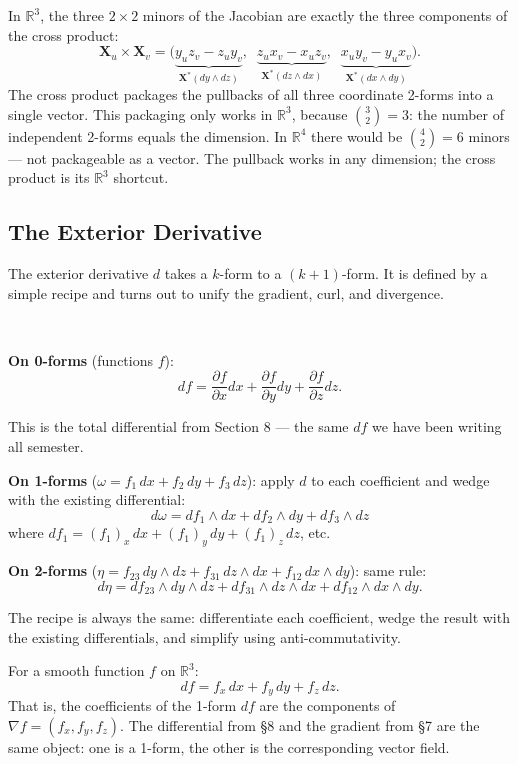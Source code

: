 \documentclass[11pt]{report}
\newcommand{\R}{\mathbb{R}}
\newcommand{\parti}[2]{\frac{\partial #1}{\partial #2}}
\begin{document}
\begin{remark}
In $\R^3$, the three $2 \times 2$ minors of the Jacobian are exactly the three components of the cross product:
\[
\mathbf{X}_u \times \mathbf{X}_v = \big(\underbrace{y_u z_v - z_u y_v}_{\mathbf{X}^*(dy \wedge dz)}, \;\; \underbrace{z_u x_v - x_u z_v}_{\mathbf{X}^*(dz \wedge dx)}, \;\; \underbrace{x_u y_v - y_u x_v}_{\mathbf{X}^*(dx \wedge dy)}\big).
\]
The cross product packages the pullbacks of all three coordinate 2-forms into a single vector. This packaging only works in $\R^3$, because $\binom{3}{2} = 3$: the number of independent 2-forms equals the dimension. In $\R^4$ there would be $\binom{4}{2} = 6$ minors --- not packageable as a vector. The pullback works in any dimension; the cross product is its $\R^3$ shortcut.
\end{remark}

\subsection{The Exterior Derivative}

The exterior derivative $d$ takes a $k$-form to a $(k+1)$-form. It is defined by a simple recipe and turns out to unify the gradient, curl, and divergence.

\begin{definition}
\

\textbf{On 0-forms} (functions $f$):
\[
df = \parti{f}{x} dx + \parti{f}{y} dy + \parti{f}{z} dz.
\]

This is the total differential from Section 8 --- the same $df$ we have been writing all semester.

\textbf{On 1-forms} ($\omega = f_1 \, dx + f_2 \, dy + f_3 \, dz$): apply $d$ to each coefficient and wedge with the existing differential:
\[
d\omega = df_1 \wedge dx + df_2 \wedge dy + df_3 \wedge dz
\]
where $df_1 = (f_1)_x \, dx + (f_1)_y \, dy + (f_1)_z \, dz$, etc.

\textbf{On 2-forms} ($\eta = f_{23} \, dy \wedge dz + f_{31} \, dz \wedge dx + f_{12} \, dx \wedge dy$): same rule:
\[
d\eta = df_{23} \wedge dy \wedge dz + df_{31} \wedge dz \wedge dx + df_{12} \wedge dx \wedge dy.
\]
\end{definition}

The recipe is always the same: differentiate each coefficient, wedge the result with the existing differentials, and simplify using anti-commutativity.

\begin{proposition}
For a smooth function $f$ on $\R^3$:
\[
df = f_x \, dx + f_y \, dy + f_z \, dz.
\]
That is, the coefficients of the 1-form $df$ are the components of $\nabla f = (f_x, f_y, f_z)$. The differential from \S8 and the gradient from \S7 are the same object: one is a 1-form, the other is the corresponding vector field.
\end{proposition}
\end{document}
